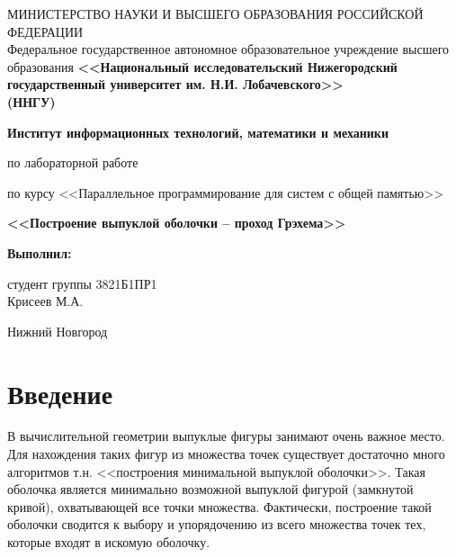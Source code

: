 \documentclass[a4paper]{article}
\begin{document}
\begin{titlepage}
 \begin{center}
{\small МИНИСТЕРСТВО НАУКИ И ВЫСШЕГО ОБРАЗОВАНИЯ РОССИЙСКОЙ ФЕДЕРАЦИИ\\
 Федеральное государственное автономное образовательное учреждение
высшего образования
}
\textbf{<<Национальный исследовательский
Нижегородский государственный университет им. Н.И. Лобачевского>>\\
(ННГУ)\\}

\vspace*{1cm}

\textbf{Институт информационных технологий, математики и механики}

\vspace*{3cm}

\textbf{}

по лабораторной работе

по курсу <<Параллельное программирование для систем с общей памятью>>

\vspace{1em}

\textbf{\large<<Построение выпуклой оболочки -- проход Грэхема>>}

\end{center}

\vspace{2cm}

\begin{flushright}
\parbox{8.5cm}{
\textbf{Выполнил:}

студент группы 3821Б1ПР1\\
Крисеев М.А.
}
\end{flushright}

\flushbottom

\vfill

\begin{center}
 Нижний Новгород

 \the\year
\end{center}

\end{titlepage}

\tableofcontents

\newpage
\section*{Введение}
\label{sec:intro}

В вычислительной геометрии выпуклые фигуры занимают очень важное место. 
Для нахождения таких фигур из множества точек существует достаточно много алгоритмов
т.н. <<построения минимальной выпуклой оболочки>>. Такая оболочка является минимально возможной
выпуклой фигурой (замкнутой кривой), охватывающей все точки множества. Фактически,
построение такой оболочки сводится к выбору и упорядочению из всего множества точек тех, которые 
входят в искомую оболочку.
\newpage
\end{document}
